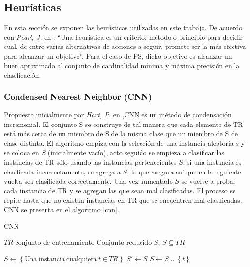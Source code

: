 \subsection{Heurísticas}

En esta sección se exponen las heurísticas utilizadas en este trabajo. De acuerdo con \emph{Pearl, J.} en \cite{pearl1984heuristics}: ``Una heurística es un criterio, método o principio para decidir cual, de entre varias alternativas de acciones a seguir, promete ser la más efectiva para alcanzar un objetivo''. Para el caso de PS, dicho objetivo es alcanzar un buen aproximado al conjunto de cardinalidad mínima y máxima precisión en la clasificación.

\subsubsection{Condensed Nearest Neighbor (CNN)}

Propuesto inicialmente por \emph{Hart, P.} en \cite{hart1968condensed},CNN es un método de condensación incremental. El conjunto S se construye de tal manera que cada elemento de TR está más cerca de un miembro de S de la misma clase que un miembro de S de clase distinta. El algoritmo empiza con la selección de una instancia aleatoria $s$ y se coloca en $S$ (inicialmente vacío), acto seguido se empieza a clasificar las instancias de TR sólo usando las instancias pertenecientes $S$; si una instancia es clasificada incorrectamente, se agrega a $S$, lo que asegura así que en la siguiente vuelta sea clasificada correctamente. Una vez aumentado $S$ se vuelve a probar cada instancia de TR y se agregan las que sean mal clasificadas. El proceso se repite hasta que no existan instancias en TR que se encuentren mal clasificadas. CNN se presenta en el algoritmo \ref{cnn}. 

\begin{algorithm}
\caption{CNN}
\label{cnn}
\begin{algorithmic}[1]

\Require $TR$ conjunto de entrenamiento
\Ensure Conjunto reducido $S$, $S \subseteq TR$

\State $S \gets \left\lbrace \mathrm{Una\ instancia\ cualquiera}\ t \in TR \right\rbrace$
\Repeat
	\State $S' \gets S$
			\State $S \gets S \cup \left\lbrace t \right\rbrace$
		\EndIf
	\EndFor
{}
\State {}
\end{algorithmic}
\end{algorithm}


